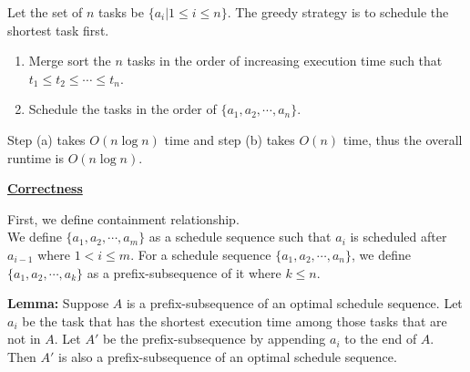 \documentclass[11pt]{article}
\begin{document}
\begin{enumerate}
\begin{enumerate}
Let the set of $n$ tasks be $\{a_i | 1 \leq i \leq n\}$. The greedy
strategy is to schedule the shortest task first.
\begin{enumerate}
\item Merge sort the $n$ tasks in the order of increasing execution time
such that $t_1 \leq t_2 \leq \cdots \leq t_n$.
\item Schedule the tasks in the order of $\{a_1,a_2,\cdots,a_n\}$.
\end{enumerate}

Step (a) takes $O(n\log n)$ time and step (b) takes $O(n)$ time, thus
the overall runtime is $O(n\log n)$.

\underline{\textbf{Correctness}}

First, we define containment relationship.\\
We define $\{a_1,a_2,\cdots,a_m\}$ as a schedule sequence such that $a_i$
is scheduled after $a_{i-1}$ where $1 < i \leq m$.
For a schedule sequence $\{a_1,a_2,\cdots,a_n\}$, we define
$\{a_1,a_2,\cdots,a_k\}$ as a prefix-subsequence of it where $k \leq n$.

\textbf{Lemma:} Suppose $A$ is a prefix-subsequence of an optimal schedule
sequence. Let $a_i$ be the task that has the shortest execution time
among those tasks that are not in $A$. Let $A'$ be the
prefix-subsequence by appending $a_i$ to the end of $A$.
Then $A'$ is also a prefix-subsequence of an optimal schedule sequence.


\end{enumerate}
\end{enumerate}
\end{document}
